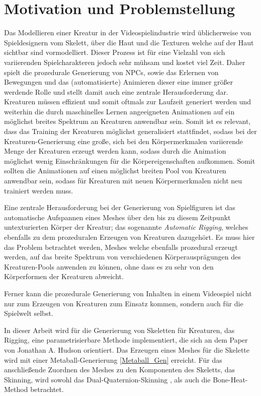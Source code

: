 \section{Motivation und Problemstellung}

Das Modellieren einer Kreatur in der Videospielindustrie wird üblicherweise von Spieldesignern vom Skelett, über die Haut und die Texturen welche auf der Haut sichtbar sind vormodelliert. Dieser Prozess ist für eine Vielzahl von sich variierenden Spielcharakteren jedoch sehr mühsam und kostet viel Zeit. Daher spielt die prozedurale Generierung von NPCs, sowie das Erlernen von Bewegungen und das (automatisierte) Animieren dieser eine immer größer werdende Rolle und stellt damit auch eine zentrale Herausforderung dar. Kreaturen müssen effizient und somit oftmals zur Laufzeit generiert werden und weiterhin die durch maschinelles Lernen angeeigneten Animationen auf ein möglichst breites Spektrum an Kreaturen anwendbar sein. Somit ist es relevant, dass das Training der Kreaturen möglichst generalisiert stattfindet, sodass bei der Kreaturen-Generierung eine große, sich bei den Körpermerkmalen variierende Menge der Kreaturen erzeugt werden kann, sodass durch die Animation möglichst wenig Einschränkungen für die Körpereigenschaften aufkommen. Somit sollten die Animationen auf einen möglichst breiten Pool von Kreaturen anwendbar sein, sodass für Kreaturen mit neuen Körpermerkmalen nicht neu trainiert werden muss.

Eine zentrale Herausforderung bei der Generierung von Spielfiguren ist das automatische Aufspannen eines Meshes über den bis zu diesem Zeitpunkt untexturierten Körper der Kreatur; das sogenannte \textit{Automatic Rigging}, welches ebenfalls zu dem prozeduralen Erzeugen von Kreaturen dazugehört. Es muss hier das Problem betrachtet werden, Meshes welche ebenfalls prozedural erzeugt werden, auf das breite Spektrum von verschiedenen Körperausprägungen des Kreaturen-Pools anwenden zu können, ohne dass es zu sehr von den Körperformen der Kreaturen abweicht.

Ferner kann die prozedurale Generierung von Inhalten in einem Videospiel nicht nur zum Erzeugen von Kreaturen zum Einsatz kommen, sondern auch für die Spielwelt selbst. 

In dieser Arbeit wird für die Generierung von Skeletten für Kreaturen, das Rigging, eine parametrisierbare Methode implementiert, die sich an dem Paper \cite{Hudson2013CreatureGU} von Jonathan A. Hudson orientiert. Das Erzeugen eines Meshes für die Skelette wird mit einer Metaball-Generierung \ref{Metaball_Gen} erreicht. Für das anschließende Zuordnen des Meshes zu den Komponenten des Skeletts, das Skinning, wird sowohl das Dual-Quaternion-Skinning \cite{dqs}, als auch die Bone-Heat-Method \cite{bone_heat_paper} betrachtet. 

